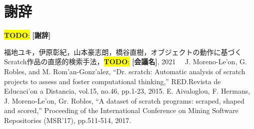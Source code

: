 \documentclass[uplatex,dvipdfmx,a4paper,twocolumn,base=11pt,jbase=11pt,ja=standard]{bxjsarticle}  %
\newcommand{\todo}[1]{\colorbox{yellow}{{\bf TODO}:}{\color{red} {\textbf{[#1]}}}}
\begin{document}







\section*{謝辞}

\todo{謝辞}

\begin{thebibliography}{1}
   福地ユキ，伊原彰紀，山本豪志朗，橋谷直樹，オブジェクトの動作に基づくScratch作品の直感的検索手法，\todo{会議名}, 2021
  　J. Moreno-Le'on, G. Robles, and M. Rom'an-Gonz'alez, ``Dr. scratch: Automatic analysis of scratch projects to assess and foster computational thinking,'' RED.Revista de Educaci'on a Distancia, vol.15, no.46, pp.1-23, 2015.
   E. Aivaloglou, F. Hermans, J. Moreno-Le'on, Gr. Robles, ``A dataset of scratch programs: scraped, shaped and scored,'' Proceeding of the International Conference on Mining Software Repositories (MSR'17), pp.511-514, 2017. 

\end{thebibliography}





%
\end{document}
